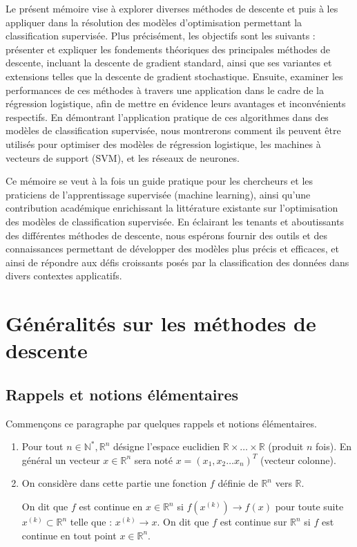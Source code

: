 \documentclass[12pt,a4paper,openay]{book}
\numberwithin{equation}{chapter}
\newcommand{\R}{\mathbb{R}}
\begin{document}
	Le pr\'esent m\'emoire vise \`a explorer diverses m\'ethodes de descente et puis à les appliquer dans la résolution des modèles d'optimisation permettant la classification supervis\'ee. Plus pr\'ecis\'ement, les objectifs sont les suivants : pr\'esenter et expliquer les fondements th\'eoriques des principales m\'ethodes de descente, incluant la descente de gradient standard, ainsi que ses variantes et extensions telles que la descente de gradient stochastique. Ensuite, examiner les performances de ces méthodes à travers une application dans le cadre de la régression logistique, afin de mettre en évidence leurs avantages et inconvénients respectifs. En démontrant l'application pratique de ces algorithmes dans des modèles de classification supervisée, nous montrerons comment ils peuvent être utilisés pour optimiser des modèles de régression logistique, les machines \`a vecteurs de support (SVM), et les r\'eseaux de neurones.
	
	Ce m\'emoire se veut \`a la fois un guide pratique pour les chercheurs et les praticiens de l'apprentissage supervisée (machine learning), ainsi qu'une contribution acad\'emique enrichissant la litt\'erature existante sur l'optimisation des mod\`eles de classification supervis\'ee. En \'eclairant les tenants et aboutissants des diff\'erentes m\'ethodes de descente, nous esp\'erons fournir des outils et des connaissances permettant de d\'evelopper des mod\`eles plus pr\'ecis et efficaces, et ainsi de r\'epondre aux d\'efis croissants pos\'es par la classification des donn\'ees dans divers contextes applicatifs.
	
	\newpage
	
	\mainmatter
	
	\vspace*{-0.5cm}
	\tableofcontents	
	\newpage
	
	\chapter{G\'en\'eralit\'es sur les m\'ethodes de descente}
	
	\section{Rappels et notions \'el\'ementaires}
	Commen\c{c}ons ce paragraphe par quelques rappels et notions \'el\'ementaires.
	\begin{enumerate}
		\item Pour tout $n \in \mathbb{N}^*, \R^n$ d\'esigne l'espace euclidien $\R   \times \ldots \times \R$ (produit $n$ fois). En g\'en\'eral un vecteur $x \in \R^n$ sera not\'e $x=\left(x_1, x_2 \ldots x_n\right)^T$ (vecteur colonne).
		\item On consid\`ere dans cette partie une fonction $f$ d\'efinie de $\R^n$ vers $\R$.
		
		On dit que $f$ est continue en $x \in \R^n$ si $f\left(x^{(k)}\right) \to f(x)$ pour toute suite $x^{(k)} \subset \R^n$ telle que : $x^{(k)} \to x$.
		On dit que $f$ est continue sur $\R^n$ si $f$ est continue en tout point $x \in \R^n$.
	\end{enumerate}
	
\end{document}
